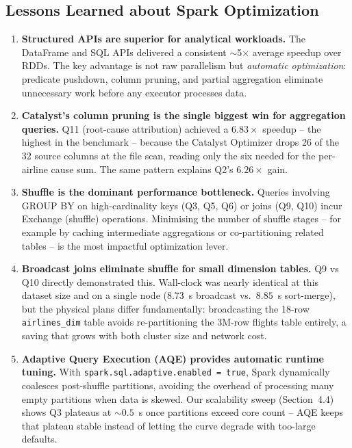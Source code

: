 \documentclass{article}
\begin{document}
\subsection{Lessons Learned about Spark Optimization}

\begin{enumerate}
    \item \textbf{Structured APIs are superior for analytical workloads.} The DataFrame and SQL APIs delivered a consistent $\sim$5$\times$ average speedup over RDDs. The key advantage is not raw parallelism but \textit{automatic optimization}: predicate pushdown, column pruning, and partial aggregation eliminate unnecessary work before any executor processes data.

    \item \textbf{Catalyst's column pruning is the single biggest win for aggregation queries.} Q11 (root-cause attribution) achieved a $6.83\times$ speedup -- the highest in the benchmark -- because the Catalyst Optimizer drops 26 of the 32 source columns at the file scan, reading only the six needed for the per-airline cause sum. The same pattern explains Q2's $6.26\times$ gain.

    \item \textbf{Shuffle is the dominant performance bottleneck.} Queries involving GROUP BY on high-cardinality keys (Q3, Q5, Q6) or joins (Q9, Q10) incur Exchange (shuffle) operations. Minimising the number of shuffle stages -- for example by caching intermediate aggregations or co-partitioning related tables -- is the most impactful optimization lever.

    \item \textbf{Broadcast joins eliminate shuffle for small dimension tables.} Q9 vs Q10 directly demonstrated this. Wall-clock was nearly identical at this dataset size and on a single node ($8.73$~s broadcast vs.\ $8.85$~s sort-merge), but the physical plans differ fundamentally: broadcasting the 18-row \texttt{airlines\_dim} table avoids re-partitioning the 3M-row flights table entirely, a saving that grows with both cluster size and network cost.

    \item \textbf{Adaptive Query Execution (AQE) provides automatic runtime tuning.} With \texttt{spark.sql.adaptive.enabled = true}, Spark dynamically coalesces post-shuffle partitions, avoiding the overhead of processing many empty partitions when data is skewed. Our scalability sweep (Section~4.4) shows Q3 plateaus at $\sim 0.5$~s once partitions exceed core count -- AQE keeps that plateau stable instead of letting the curve degrade with too-large defaults.


\end{enumerate}
\end{document}
